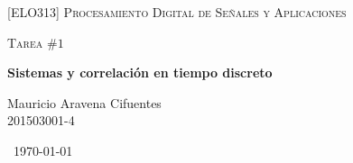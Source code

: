 \documentclass[a4paper]{article}
\begin{document}
\begin{titlepage}
	\centering
	{\scshape\LARGE [ELO313] Procesamiento Digital de Señales y Aplicaciones\par}
	\vspace{1cm}
	{\scshape\Large Tarea $\#1$\par}
	\vspace{5cm}	
	{\huge\bfseries Sistemas y correlación en tiempo discreto \par}
	\vspace{9cm}
	{\Large\Large Mauricio Aravena Cifuentes \\ 201503001-4}
	\vfill
	{\large \ \today \par}
\end{titlepage}


\end{document}
